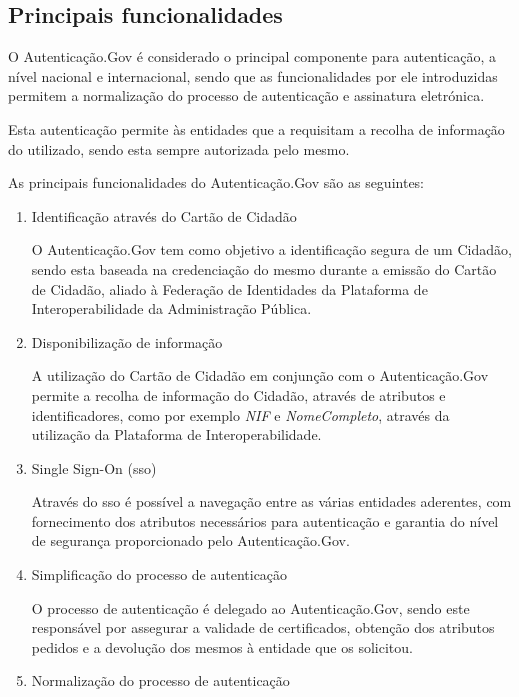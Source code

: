 \cleardoublepage
\subsection{Principais funcionalidades} \label{authGovFuncionalidades}

O Autenticação.Gov é considerado o principal componente para autenticação, a nível nacional e internacional, sendo que as funcionalidades por ele introduzidas permitem a normalização do processo de autenticação e assinatura eletrónica.

Esta autenticação permite às entidades que a requisitam a recolha de informação do utilizado, sendo esta sempre autorizada pelo mesmo.

As principais funcionalidades do Autenticação.Gov são as seguintes:

\begin{enumerate}
    \item Identificação através do Cartão de Cidadão
    
    O Autenticação.Gov tem como objetivo a identificação segura de um Cidadão, sendo esta baseada na credenciação do mesmo durante a emissão do Cartão de Cidadão, aliado à Federação de Identidades da Plataforma de Interoperabilidade da Administração Pública.
    
    \item Disponibilização de informação
    
    A utilização do Cartão de Cidadão em conjunção com o Autenticação.Gov permite a recolha de informação do Cidadão, através de atributos e identificadores, como por exemplo \textit{NIF} e \textit{NomeCompleto}, através da utilização da Plataforma de Interoperabilidade.
    
    \item Single Sign-On (\gls{sso})
    
    Através do \gls{sso} é possível a navegação entre as várias entidades aderentes, com fornecimento dos atributos necessários para autenticação e garantia do nível de segurança proporcionado pelo Autenticação.Gov.
    
    \item Simplificação do processo de autenticação
    
    O processo de autenticação é delegado ao Autenticação.Gov, sendo este responsável por assegurar a validade de certificados, obtenção dos atributos pedidos e a devolução dos mesmos à entidade que os solicitou.
    
    \item Normalização do processo de autenticação
    

\end{enumerate}
